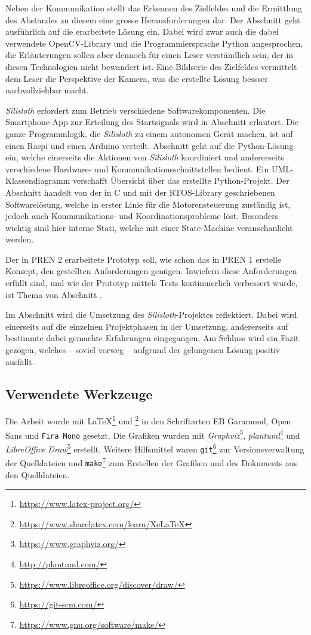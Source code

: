 Neben der Kommunikation stellt das Erkennen des Zielfeldes und die Ermittlung des Abstandes zu diesem eine grosse Herausforderungen dar. Der Abschnitt  geht ausführlich auf die erarbeitete Lösung ein. Dabei wird zwar auch die dabei verwendete OpenCV-Library und die Programmiersprache Python angesprochen, die Erläuterungen sollen aber dennoch für einen Leser verständlich sein, der in diesen Technologien nicht bewandert ist. Eine Bildserie des Zielfeldes vermittelt dem Leser die Perspektive der Kamera, was die erstellte Lösung bessser nachvollziehbar macht.

\textit{Silisloth} erfordert zum Betrieb verschiedene Softwarekomponenten. Die Smartphone-App zur Erteilung des Startsignals wird in Abschnitt  erläutert. Die ganze Programmlogik, die \textit{Silisloth} zu einem autonomen Gerät machen, ist auf einen Raspi und einen Arduino verteilt. Abschnitt  geht auf die Python-Lösung ein, welche einerseits die Aktionen von \textit{Silisloth} koordiniert und andererseits verschiedene Hardware- und Kommunikationsschnittstellen bedient. Ein UML-Klassendiagramm verschafft Übersicht über das erstellte Python-Projekt. Der Abschnitt  handelt von der in C und mit der RTOS-Library geschriebenen Softwarelösung, welche in erster Linie für die Motorensteuerung zuständig ist, jedoch auch Kommunikations- und Koordinationsprobleme löst. Besonders wichtig sind hier interne Stati, welche mit einer State-Machine veranschaulicht werden.

Der in PREN 2 erarbeitete Prototyp soll, wie schon das in PREN 1 erstelle Konzept, den gestellten Anforderungen genügen. Inwiefern diese Anforderungen erfüllt sind, und wie der Prototyp mittels Tests kontinuierlich verbessert wurde, ist Thema von Abschnitt .

Im Abschnitt  wird die Umsetzung des \textit{Silisloth}-Projektes reflektiert. Dabei wird einerseits auf die einzelnen Projektphasen in der Umsetzung, andererseits auf bestimmte dabei gemachte Erfahrungen eingegangen. Am Schluss wird ein Fazit gezogen, welches -- soviel vorweg -- aufgrund der gelungenen Lösung positiv ausfällt.

\subsection{Verwendete Werkzeuge}

Die Arbeit wurde mit \LaTeX\footnote{\url{https://www.latex-project.org/}} und \XeLaTeX\footnote{\url{https://www.sharelatex.com/learn/XeLaTeX}} in den Schriftarten EB Garamond, \textsf{Open Sans} und \texttt{Fira Mono} gesetzt. Die Grafiken wurden mit \textit{Graphviz}\footnote{\url{https://www.graphviz.org/}}, \textit{plantuml}\footnote{\url{http://plantuml.com/}} und \textit{LibreOffice Draw}\footnote{\url{https://www.libreoffice.org/discover/draw/}} erstellt. Weitere Hilfsmittel waren \texttt{git}\footnote{\url{https://git-scm.com/}} zur Versionsverwaltung der Quelldateien und \texttt{make}\footnote{\url{https://www.gnu.org/software/make/}} zum Erstellen der Grafiken und des Dokuments aus den Quelldateien.
